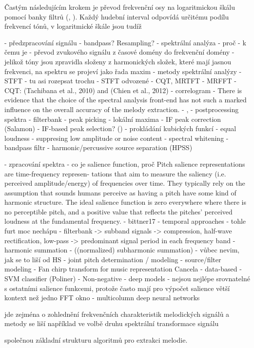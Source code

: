 Častým následujícím krokem je převod frekvenční osy na logaritmickou škálu pomocí banky filtrů (, ). Každý hudební interval odpovídá určitému podílu frekvencí tónů, v logaritmické škále jsou tudíž 

- předzpracování signálu
    - bandpass? Resampling?
- spektrální analýza
    - proč - k čemu je
        - převod zvukového signálu z časové domény do frekvenční domény
        - jelikož tóny jsou zpravidla složeny z harmonických složek, které mají jasnou frekvenci, na spektru se projeví jako řada maxim
    - metody spektrální analýzy
        - STFT
            - tu asi rozepsat trochu
        - STFT odvozené - CQT, MRTFT
            - MRFFT \cite{Goto1999}
            - CQT: (Tachibana et al., 2010) and (Chien et al., 2012)
        - correlogram
        - There is evidence that the choice of the spectral analysis front-end has not such a marked influence on the overall accuracy of the melody extraction.
            - \cite{Dressler2016}, \cite{Salamon2014}
    - postprocessing spektra
        - filterbank \cite{Ryynanen2008}
        - peak picking  
            - lokální maxima \cite{Arora2013}
            - IF peak correction (Salamon)
            - IF-based peak selection? (\cite{Goto1999})
            - prokládání kubických funkcí
        - equal loudness
        - suppresing low amplitude or noise content
            - spectral whitening
        - bandpass filtr \cite{Goto1999}
        - harmonic/percussive source separation (HPSS)

- zpracování spektra
    - co je salience function, proč
        Pitch salience representations are time-frequency represen- tations that aim to measure the saliency (i.e. perceived amplitude/energy) of frequencies over time. They typically rely on the assumption that sounds humans perceive as having a pitch have some kind of harmonic structure. The ideal salience function is zero everywhere where there is no perceptible pitch, and a positive value that reflects the pitches’ perceived loudness at the fundamental frequency. - bittner17
    - temporal approaches
        - tohle furt moc nechápu
            - filterbank -> subband signals
            -> compression, half-wave rectification, low-pass
            -> predominant signal period in each frequency band
    - harmonic summation
    - ((normalized) subharmonic summation) - vůbec nevim, jak se to liší od HS
    - joint pitch determination / modeling
        - source/filter modeling
    - Fan chirp transform for music representation Cancela
    - data-based
        - SVM classifier (Poliner)
        - Non-negative 
    - deep models
        - nejsou nejlépe srovnatelné s ostatními salience funkcemi, protože často mají pro výpočet salience větší kontext než jedno FFT okno
        - multicolumn deep neural networks \cite{Kum2016}


 jde zejména o zohlednění frekvenčních charakteristik melodických signálů a metody se liší například ve volbě druhu spektrální transformace signálu

 společnou základní strukturu algoritmů pro extrakci melodie.  